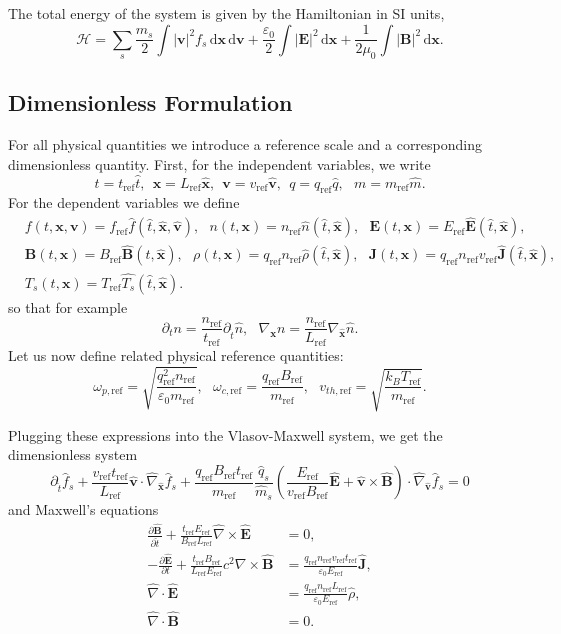 \documentclass[english]{article}
\newcommand{\bx}{\textbf{x}}
\newcommand{\bv}{\textbf{v}}
\newcommand{\bB}{\textbf{B}}
\newcommand{\bE}{\textbf{E}}
\newcommand{\bJ}{\textbf{J}}
\newcommand{\du}{\,\mathrm{d}}
\newcommand{\tr}{t_{\mathrm{ref}}}
\newcommand{\xr}{L_{\mathrm{ref}}}
\newcommand{\nr}{n_{\mathrm{ref}}}
\newcommand{\fr}{f_{\mathrm{ref}}}
\newcommand{\qr}{q_{\mathrm{ref}}}
\newcommand{\Tr}{T_{\mathrm{ref}}}
\newcommand{\mr}{m_{\mathrm{ref}}}
\newcommand{\Br}{B_{\mathrm{ref}}}
\newcommand{\Er}{E_{\mathrm{ref}}}
\newcommand{\vr}{v_{\mathrm{ref}}}
\newcommand{\vthr}{v_{th,\mathrm{ref}}}
\newcommand{\ompr}{\omega_{p,\mathrm{ref}}}
\newcommand{\omcr}{\omega_{c,\mathrm{ref}}}
\newcommand{\nablaht}{\hat{\nabla}}
\newcommand{\nablaxht}{\hat{\nabla}_{\xht}}
\newcommand{\nablavht}{\hat{\nabla}_{\vht}}
\newcommand{\tht}{\hat{t}}
\newcommand{\xht}{\hat{\bx}}
\newcommand{\vht}{\hat{\bv}}
\newcommand{\qht}{\hat{q}}
\newcommand{\mht}{\hat{m}}
\newcommand{\Eht}{\hat{\bE}}
\newcommand{\Bht}{\hat{\bB}}
\newcommand{\Jht}{\hat{\bJ}}
\newcommand{\rhoht}{\hat{\rho}}
\newcommand{\nht}{\hat{n}}
\newcommand{\Tsht}{\hat{T_{s}}}
\newcommand{\fht}{\hat{f}}
\begin{document}
The total energy of the system is given by the Hamiltonian in SI units,
\begin{equation}\label{eq:hamiltonian}
	\mathcal{H}=\sum_s\frac{m_s}{2}\int |\bv|^2 f_s \du\bx \du\bv + \frac{\varepsilon_0}{2} \int |\bE|^2 \du\bx + \frac{1}{2\mu_0} \int |\bB|^2 \du\bx.
\end{equation}



\subsection{Dimensionless Formulation}

For all physical quantities we introduce a reference scale and a corresponding dimensionless quantity.
First, for the independent variables, we write
$$t= \tr \tht, ~~ \bx= \xr \xht, ~~ \bv = \vr \vht, ~~ q = \qr\qht, ~~~ m = \mr\mht.$$
For the dependent variables we define
\begin{align*}
	 & f(t,\bx,\bv) = \fr \fht(\tht, \xht, \vht),~~~
	n(t,\bx) = \nr \nht(\tht, \xht), ~~~
	\bE(t,\bx) = \Er \Eht(\tht, \xht),               \\
	 & \bB(t,\bx) = \Br \Bht(\tht, \xht), ~~~
	\rho(t,\bx) = \qr\nr \rhoht(\tht, \xht), ~~~
	\bJ(t,\bx) = \qr\nr\vr \Jht(\tht, \xht),         \\
	 & T_s(t,\bx) = \Tr\Tsht(\tht, \xht).
\end{align*}
so that for example
$$\partial_t n = \frac{\nr}{\tr}\partial_{\tht} \nht, ~~~ \nabla_\bx n =  \frac{\nr}{\xr}\nabla_{\xht} \nht.$$
Let us now define related physical reference quantities:
\begin{equation}
	\ompr =\sqrt{\frac{\qr^2\nr}{\varepsilon_0\mr} }, ~~~ \omcr=\frac{\qr\Br}{\mr}, ~~~ \vthr = \sqrt{\frac{k_B \Tr}{\mr}}.
\end{equation}

Plugging these expressions into the Vlasov-Maxwell system, we get the dimensionless system
\begin{equation}\label{eq:Vlasovtr}
	\partial_{\tht} \fht_s + \frac{\vr\tr}{\xr}\vht \cdot \nablaxht \fht_s + \frac{\qr\Br\tr}{\mr} \frac{\qht_s}{\mht_s} \left( \frac{\Er}{\vr\Br}\Eht + \vht \times \Bht \right) \cdot \nablavht \fht_s = 0
\end{equation}
and Maxwell's equations
\begin{align}
	\frac{\partial \Bht}{\partial \tht} + \frac{\tr \Er}{\Br\xr}\nablaht \times \Eht  & = 0 ,                                         \\
	-  \frac{\partial \Eht}{\partial t} + \frac{\tr\Br}{\xr\Er} c^2\nabla \times \Bht & = \frac{\qr\nr\vr\tr}{\varepsilon_0\Er}\Jht , \\
	\nablaht \cdot \Eht                                                               & = \frac{\qr\nr\xr}{\varepsilon_0\Er}\rhoht,   \\
	\nablaht \cdot \Bht                                                               & = 0.
\end{align}
\end{document}
